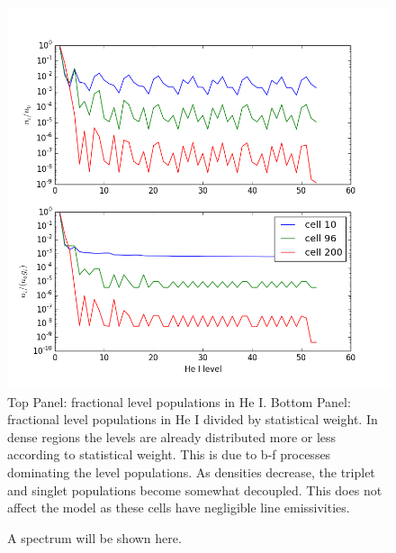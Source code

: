 \documentclass{article}
\begin{document}
\begin{figure}	%
\centering
\includegraphics[width=1.0\textwidth]{pops.png}
\caption
{
Top Panel: fractional level populations in He I. Bottom Panel: fractional level populations in He I divided by statistical weight. In dense regions the levels are already distributed more or less according to statistical weight. This
is due to b-f processes dominating the level populations. As densities decrease, the triplet and singlet populations
become somewhat decoupled. This does not affect the model as these cells have negligible line emissivities.
}
\label{f1}
\end{figure}

\begin{figure}	%
\centering
\caption{
A spectrum will be shown here.
}
\label{f2}
\end{figure}
\end{document}
